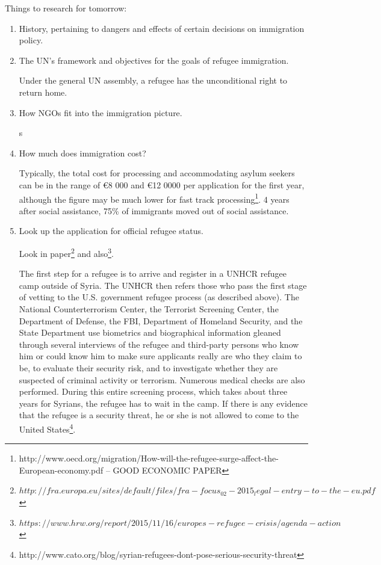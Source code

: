 \documentclass{article}
\begin{document}
Things to research for tomorrow:
\begin{enumerate}
    \item History, pertaining to dangers and effects of certain decisions on immigration policy.
    \item The UN's framework and objectives for the goals of refugee immigration.

    Under the general UN assembly, a refugee has the unconditional right to return home.

    \item How NGOs fit into the immigration picture.

    s

    \item How much does immigration cost?

    Typically, the total cost for processing and accommodating asylum seekers can be in the range of €8 000 and €12 0000 per application for the first year, although the figure may be much lower for fast track processing\footnote{http://www.oecd.org/migration/How-will-the-refugee-surge-affect-the-European-economy.pdf -- GOOD ECONOMIC PAPER}. 4 years after social assistance, 75\% of immigrants moved out of social assistance.

    \item Look up the application for official refugee status.

    Look in paper\footnote{$http://fra.europa.eu/sites/default/files/fra-focus_02-2015_legal-entry-to-the-eu.pdf$} and also\footnote{$https://www.hrw.org/report/2015/11/16/europes-refugee-crisis/agenda-action$}.

    The first step for a refugee is to arrive and register in a UNHCR refugee camp outside of Syria. The UNHCR then refers those who pass the first stage of vetting to the U.S. government refugee process (as described above). The National Counterterrorism Center, the Terrorist Screening Center, the Department of Defense, the FBI, Department of Homeland Security, and the State Department use biometrics and biographical information gleaned through several interviews of the refugee and third-party persons who know him or could know him to make sure applicants really are who they claim to be, to evaluate their security risk, and to investigate whether they are suspected of criminal activity or terrorism.  Numerous medical checks are also performed.  During this entire screening process, which takes about three years for Syrians, the refugee has to wait in the camp. If there is any evidence that the refugee is a security threat, he or she is not allowed to come to the United States\footnote{http://www.cato.org/blog/syrian-refugees-dont-pose-serious-security-threat}.


\end{enumerate}
\end{document}
